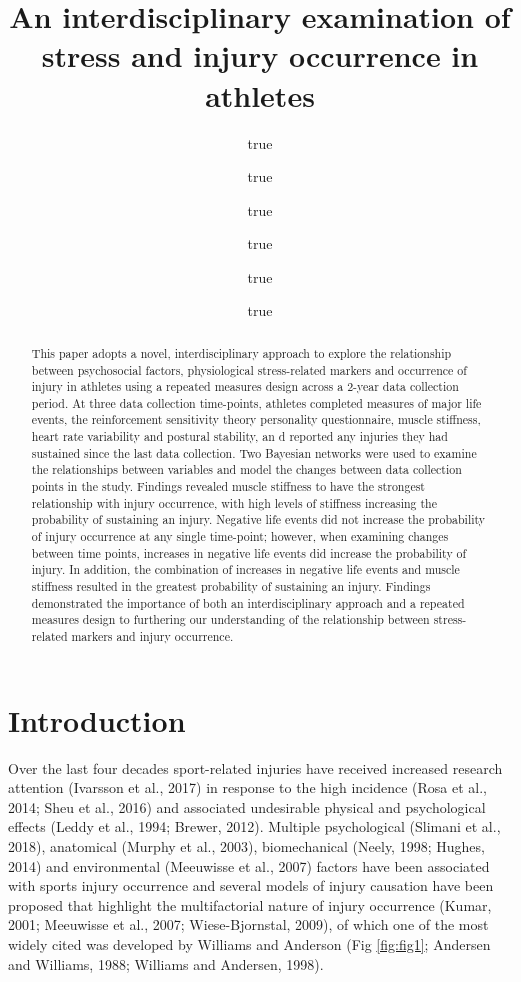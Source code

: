 \documentclass[
]{frontiersHLTH}
\title{An interdisciplinary examination of stress and injury occurrence
in athletes}
\author{true \and true \and true \and true \and true \and true}
\date{}
\begin{document}
\maketitle

\begin{abstract}

This paper adopts a novel, interdisciplinary approach to explore the relationship between psychosocial factors, physiological stress-related markers and occurrence of injury in athletes using a repeated measures design across a 2-year data collection period. At three data collection time-points, athletes completed measures of major life events, the reinforcement sensitivity theory personality questionnaire, muscle stiffness, heart rate variability and postural stability, an
d reported any injuries they had sustained since the last data collection. Two Bayesian networks were used to examine the relationships between variables and model the changes between data collection points in the study. Findings revealed muscle stiffness to have the strongest relationship with injury occurrence, with high levels of stiffness increasing the probability of sustaining an injury. Negative life events did not increase the probability of injury occurrence at any single time-point; however, when examining changes between time points, increases in negative life events did increase the probability of injury. In addition, the combination of increases in negative life events and muscle stiffness resulted in the greatest probability of sustaining an injury. Findings demonstrated the importance of both an interdisciplinary approach and a repeated measures design to furthering our understanding of the relationship between stress-related  markers and injury occurrence.

\tiny

\end{abstract}

\section{Introduction}

Over the last four decades sport-related injuries have received
increased research attention (Ivarsson et al., 2017) in response to the
high incidence (Rosa et al., 2014; Sheu et al., 2016) and associated
undesirable physical and psychological effects (Leddy et al., 1994;
Brewer, 2012). Multiple psychological (Slimani et al., 2018), anatomical
(Murphy et al., 2003), biomechanical (Neely, 1998; Hughes, 2014) and
environmental (Meeuwisse et al., 2007) factors have been associated with
sports injury occurrence and several models of injury causation have
been proposed that highlight the multifactorial nature of injury
occurrence (Kumar, 2001; Meeuwisse et al., 2007; Wiese-Bjornstal, 2009),
of which one of the most widely cited was developed by Williams and
Anderson (Fig \ref{fig:fig1}; Andersen and Williams, 1988; Williams and
Andersen, 1998).
\end{document}
